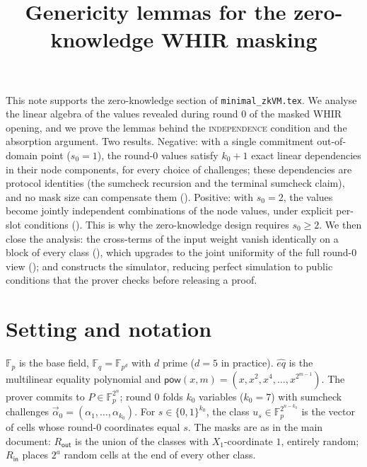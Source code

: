 \documentclass{article}
\title{Genericity lemmas for the zero-knowledge WHIR masking}
\author{}
\date{}
\newcommand{\Fp}{\mathbb{F}_p}
\newcommand{\Fq}{\mathbb{F}_q}
\newcommand{\extdeg}{d}
\newcommand{\pow}{\mathsf{pow}}
\theoremstyle{definition}
\begin{document}
\maketitle

This note supports the zero-knowledge section of \texttt{minimal\_zkVM.tex}. We analyse the linear algebra of the values revealed during round 0 of the masked WHIR opening, and we prove the lemmas behind the \textsc{independence} condition and the absorption argument. Two results. Negative: with a single commitment out-of-domain point ($s_0 = 1$), the round-0 values satisfy $k_0 + 1$ exact linear dependencies in their node components, for every choice of challenges; these dependencies are protocol identities (the sumcheck recursion and the terminal sumcheck claim), and no mask size can compensate them (). Positive: with $s_0 = 2$, the values become jointly independent combinations of the node values, under explicit per-slot conditions (). This is why the zero-knowledge design requires $s_0 \geq 2$. We then close the analysis: the cross-terms of the input weight vanish identically on a block of every class (), which upgrades  to the joint uniformity of the full round-0 view (); and  constructs the simulator, reducing perfect simulation to public conditions that the prover checks before releasing a proof.

\section{Setting and notation}

$\Fp$ is the base field, $\Fq = \mathbb{F}_{p^{\extdeg}}$ with $\extdeg$ prime ($\extdeg = 5$ in practice). $\hat{eq}$ is the multilinear equality polynomial and $\pow(x, m) = (x, x^2, x^4, \dots, x^{2^{m-1}})$. The prover commits to $P \in \Fp^{2^n}$; round 0 folds $k_0$ variables ($k_0 = 7$) with sumcheck challenges $\vec{\alpha}_0 = (\alpha_1, \dots, \alpha_{k_0})$. For $s \in \{0,1\}^{k_0}$, the class $u_s \in \Fp^{2^{n-k_0}}$ is the vector of cells whose round-0 coordinates equal $s$. The masks are as in the main document: $R_{\mathsf{out}}$ is the union of the classes with $X_1$-coordinate $1$, entirely random; $R_{\mathsf{in}}$ places $2^a$ random cells at the end of every other class.
\end{document}
